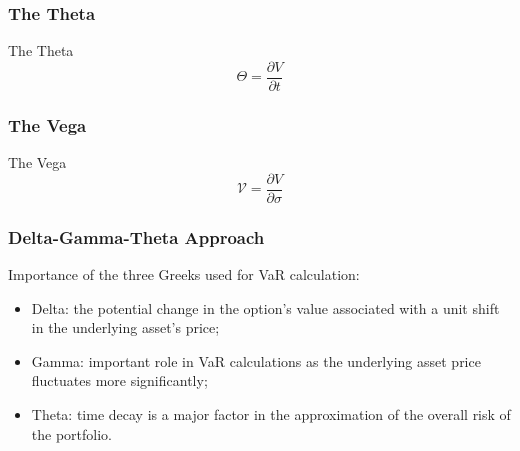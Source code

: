\documentclass{beamer}
\begin{document}
\begin{frame}
    \frametitle{The Theta}
    \begin{block}{The Theta}
        $$
        \Theta = \frac{\partial V}{\partial t}
        $$  
    \end{block}
\end{frame}

\begin{frame}
    \frametitle{The Vega}
    \begin{block}{The Vega}
        $$ 
        \mathcal{V}  = \frac{\partial V}{\partial \sigma}
        $$  
    \end{block}
\end{frame}

\begin{frame}
    \frametitle{Delta-Gamma-Theta Approach}
    Importance of the three Greeks used for VaR calculation:
    \begin{itemize}
        \item Delta: the potential change 
        in the option's value associated with a 
        unit shift in the underlying asset's price;
        \item Gamma: important role in 
        VaR calculations as the underlying asset price 
        fluctuates more significantly;
        \item Theta: time decay is a major factor
        in the approximation of the overall risk of the portfolio.
    \end{itemize}
\end{frame}
\end{document}
